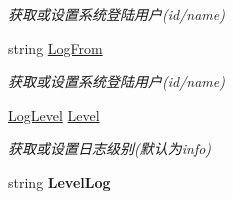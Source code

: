 \begin{DoxyCompactItemize}
\begin{DoxyCompactList}\small\item\em 获取或设置系统登陆用户(id/name) \end{DoxyCompactList}\item 
string \hyperlink{class_krs_1_1_base_1_1_logs_1_1_log_message_info_a605395da814c8a43a7cdc3831d7f51cd}{Log\-From}
\begin{DoxyCompactList}\small\item\em 获取或设置系统登陆用户(id/name) \end{DoxyCompactList}\item 
\hyperlink{namespace_krs_1_1_base_1_1_logs_aa1f948e33e410052b2716d8b68ec6583}{Log\-Level} \hyperlink{class_krs_1_1_base_1_1_logs_1_1_log_message_info_a5649136dbdcee8cd457230a0a4f99e20}{Level}
\begin{DoxyCompactList}\small\item\em 获取或设置日志级别(默认为info) \end{DoxyCompactList}\item 
\hypertarget{class_krs_1_1_base_1_1_logs_1_1_log_message_info_a7b249b29a84cf019de4a97e522f64f83}{string {\bfseries Level\-Log}}\label{class_krs_1_1_base_1_1_logs_1_1_log_message_info_a7b249b29a84cf019de4a97e522f64f83}


\end{DoxyCompactItemize}
